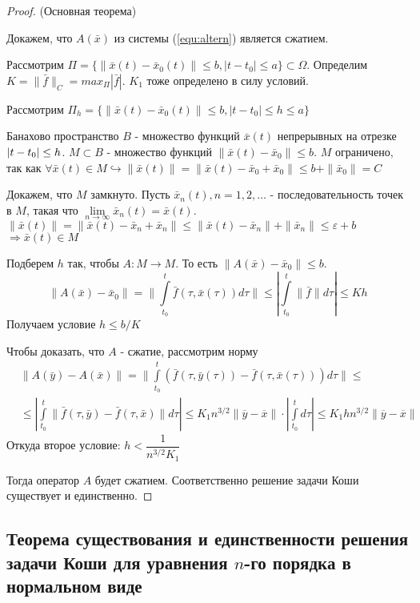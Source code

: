 \begin{proof}
	(Основная теорема)
	
	Докажем, что $A(\bar{x})$ из системы (\ref{equ:altern}) является сжатием.
	
	Рассмотрим $\Pi = \{\|\bar{x}(t) - \bar{x}_0(t)\| \le b, |t-t_0| \le a   \} \subset \Omega$. Определим $K = \|\bar{f}\|_C = max_{\Pi}|\bar{f}|$. $K_1$ тоже определено в силу условий.
	
	Рассмотрим $\Pi_h = \{\|\bar{x}(t) - \bar{x}_0(t)\| \le b, |t-t_0| \le h \le a   \}$
	
	Банахово пространство $B$ - множество функций $\bar{x}(t)$ непрерывных на отрезке $|t-t_0|\hm\le h$. $M \subset B$ - множество функций $\|\bar{x}(t) - \bar{x}_0\| \le b$. $M$ ограничено, так как $\forall \bar{x}(t) \in M \hookrightarrow \|\bar{x}(t)\| = \|\bar{x}(t) - \bar{x}_0 + \bar{x}_0\| \le b + \|\bar{x}_0\| = C$
	
	Докажем, что $M$ замкнуто. Пусть $\bar{x}_n(t), n = 1, 2, \dots$ - последовательность точек в $M$, такая что $\lim\limits_{n\to \infty} \bar{x}_n(t) = \bar{x}(t)$. $\|\bar{x}(t)\| = \|\bar{x}(t) - \bar{x}_n + \bar{x}_n\| \le \|\bar{x}(t) - \bar{x}_n\| + \|\bar{x}_n\| \le \varepsilon + b$ $\Rightarrow \bar{x}(t) \in M$
	
	Подберем $h$ так, чтобы $A:M\to M$. То есть $\|A(\bar{x}) - \bar{x}_0\| \le b$.
	\[
		\|A(\bar{x}) - \bar{x}_0\| = \|\int\limits_{t_0}^t \bar{f}(\tau, \bar{x}(\tau))d\tau\| \le |\int\limits_{t_0}^t \|\bar{f}\|d\tau| \le Kh
	\]
	Получаем условие $h\le b/K$
	
	Чтобы доказать, что $A$ - сжатие, рассмотрим норму
	\begin{align*}
		&\|A(\bar{y}) - A(\bar{x})\| = \|\int\limits_{t_0}^t(\bar{f}(\tau, \bar{y}(\tau)) - \bar{f}(\tau, \bar{x}(\tau)))d\tau\|\le \\ &\le |\int\limits_{t_0}^t \|\bar{f}(\tau, \bar{y}) - \bar{f}(\tau, \bar{x})\|d\tau| \le K_1n^{3/2}\|\overline{y} - \overline{x}\|\cdot|\int\limits_{t_0}^td\tau| \le K_1hn^{3/2}\|\overline{y} - \overline{x}\|
	\end{align*}
	Откуда второе условие: $h < \dfrac{1}{n^{3/2}K_1}$
	
	Тогда оператор $A$ будет сжатием. Соответственно решение задачи Коши существует и единственно.
	
\end{proof}

\subsection{Теорема существования и единственности решения задачи Коши для уравнения $n$-го порядка в нормальном виде}

